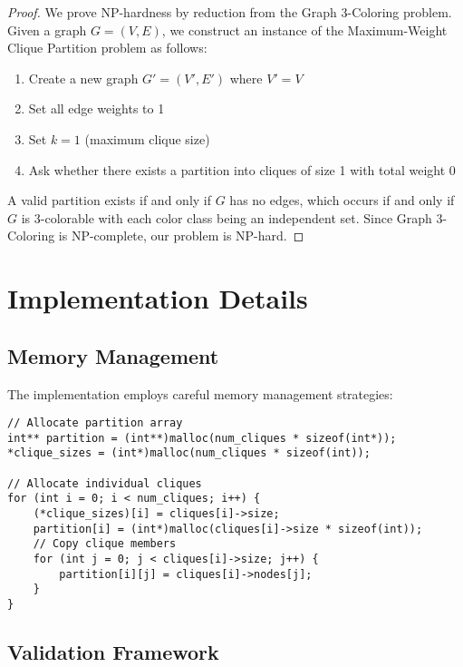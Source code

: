 \documentclass[12pt,a4paper]{article}
\begin{document}
\begin{proof}
We prove NP-hardness by reduction from the Graph 3-Coloring problem. Given a graph $G = (V, E)$, we construct an instance of the Maximum-Weight Clique Partition problem as follows:

\begin{enumerate}
    \item Create a new graph $G' = (V', E')$ where $V' = V$
    \item Set all edge weights to 1
    \item Set $k = 1$ (maximum clique size)
    \item Ask whether there exists a partition into cliques of size 1 with total weight 0
\end{enumerate}

A valid partition exists if and only if $G$ has no edges, which occurs if and only if $G$ is 3-colorable with each color class being an independent set. Since Graph 3-Coloring is NP-complete, our problem is NP-hard.
\end{proof}

\section{Implementation Details}

\subsection{Memory Management}

The implementation employs careful memory management strategies:

\begin{lstlisting}[caption=Memory Allocation Pattern]
// Allocate partition array
int** partition = (int**)malloc(num_cliques * sizeof(int*));
*clique_sizes = (int*)malloc(num_cliques * sizeof(int));

// Allocate individual cliques
for (int i = 0; i < num_cliques; i++) {
    (*clique_sizes)[i] = cliques[i]->size;
    partition[i] = (int*)malloc(cliques[i]->size * sizeof(int));
    // Copy clique members
    for (int j = 0; j < cliques[i]->size; j++) {
        partition[i][j] = cliques[i]->nodes[j];
    }
}
\end{lstlisting}

\subsection{Validation Framework}
\end{document}
